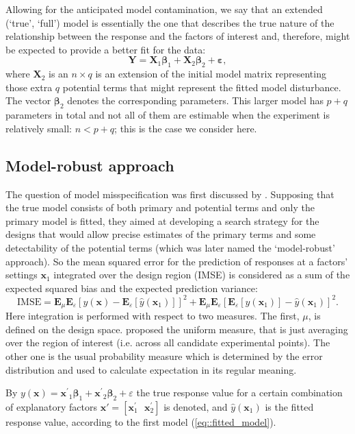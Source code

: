 Allowing for the anticipated model contamination, we say that an extended (`true', `full') model is essentially the one that describes the true nature of the relationship between the response and the factors of interest and, therefore, might be expected to provide a better fit for the data:
\begin{equation}
\label{eq::full_model}
\bm{Y}=\bm{X}_1\bm{\beta}_1+\bm{X}_2\bm{\beta}_2+\bm{\varepsilon},
\end{equation}
where $\bm{X}_2$ is an $n\times q$ is an extension of the initial model matrix representing those extra $q$ potential terms that might represent the fitted model disturbance. The vector $\bm{\beta}_2$ denotes the corresponding parameters. This larger model has $p+q$ parameters in total and not all of them are estimable when the experiment is relatively small: $n<p+q$; this is the case we consider here.

\subsection{Model-robust approach}
The question of model misspecification was first discussed by \cite{Box1959}. Supposing that the true model consists of both primary and potential terms and only the primary model is fitted, they aimed at developing a search strategy for the designs that would allow precise estimates of the primary terms and some detectability of the potential terms (which was later named the `model-robust' approach). So the mean squared error for the prediction of responses at a factors' settings $\bm{x}_1$ integrated over the design region (IMSE) is considered as a sum of the expected squared bias and the expected prediction variance:
\begin{equation}
\label{eq::IMSE}
\mbox{IMSE}=\textbf{E}_{\mu}\textbf{E}_{\varepsilon}[y(\bm{x})-\textbf{E}_{\varepsilon}[\hat{y}(\bm{x}_1)]]^{2}+\textbf{E}_{\mu}\textbf{E}_{\varepsilon}[\textbf{E}_{\varepsilon}[\hat{y}(\bm{x}_1)]-\hat{y}(\bm{x}_1)]^{2}.  
\end{equation}
Here integration is performed with respect to two measures. The first, $\mu$, is defined on the design space. \cite{Box1959} proposed the uniform measure, that is just averaging over the region of interest (i.e. across all candidate experimental points). The other one is the usual probability measure which is determined by the error distribution and used to calculate expectation in its regular meaning.

By $y(\bm{x})=\bm{x^{'}}_{1}\bm{\beta}_1+\bm{x^{'}}_{2}\bm{\beta}_2+\varepsilon$ the true response value for a certain combination of explanatory factors $\bm{x}'=[\bm{x}^{'}_{1}\mbox{ } \bm{x}^{'}_{2}]$ is denoted, and $\hat{y}(\bm{x}_{1})$ is the fitted response value, according to the first model (\ref{eq::fitted_model}).

